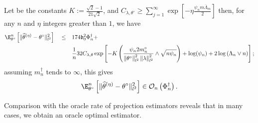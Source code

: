 \begin{thm}\label{THM_FREQ_CIRCDECONV_KNOWN_IID_ORACLE_NP}
Let be the constants $K := \frac{\sqrt{2} - 1}{21 \sqrt{2}}$, and $C_{\lambda, \theta^{\circ}} \geq \sum\limits_{j = 1}^{\infty} \exp\left[- \eta \frac{\psi_{n} m \overline{\Lambda}_{m}}{2}\right]$ then, for any $n$ and $\eta$ integers greater than $1$, we have
\begin{alignat*}{3}
& \E_{\theta^{\circ}}^{n}\left[\Vert \widehat{\theta}^{(\eta)} - \theta^{\circ} \Vert_{l^{2}}^{2}\right] && \leq && 174 \mathfrak{b}_{0}^{2} \Phi^{\dagger}_{n} + \\
& && && \frac{1}{n} 32 C_{\lambda, \theta} \exp\left[- K\left(\frac{\psi_{n} 2 m^{\circ}_{n}}{\left\Vert \theta^{\circ} \right\Vert_{l^{2}}^{2} \left\Vert \lambda \right\Vert_{l^{2}}^{2}}\wedge \sqrt{n \psi_{n}}\right) + \log(\psi_{n}) + 2 \log\left(\Lambda_{n} \vee n\right)\right];
\end{alignat*}
assuming $m^{\dagger}_{n}$ tends to $\infty$, this gives
\[\E_{\theta^{\circ}}^{n}\left[\Vert \widehat{\theta}^{(\eta)} - \theta^{\circ} \Vert_{l^{2}}^{2}\right] \in \mathcal{O}_{n}\left(\Phi^{\dagger}_{n}\right).\]
\end{thm}

Comparison with the oracle rate of projection estimators reveals that in many cases, we obtain an oracle optimal estimator.

